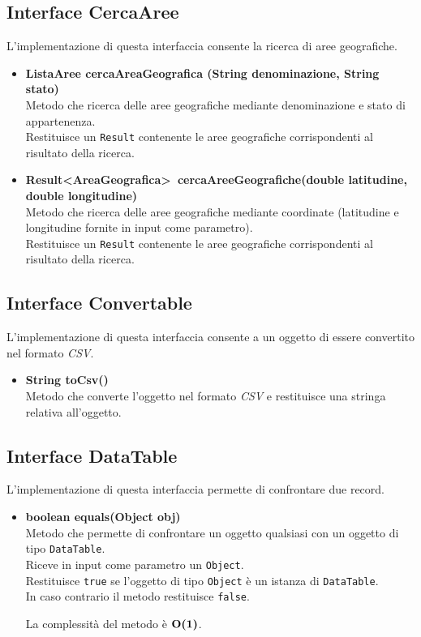\documentclass[a4paper, 12pt]{scrreprt}
\begin{document}
			\subsection{Interface CercaAree}
			L'implementazione di questa interfaccia consente la ricerca di aree geografiche.
			\begin{itemize}
				\item \textbf{ListaAree cercaAreaGeografica (String denominazione, String stato)}
				\\Metodo che ricerca delle aree geografiche mediante denominazione e stato di appartenenza.
				\\Restituisce un \verb!Result! contenente le aree geografiche corrispondenti al risultato della ricerca.
				
				\item\textbf{Result\textless AreaGeografica\textgreater~cercaAreeGeografiche(double latitudine, double longitudine)}
				\\Metodo che ricerca delle aree geografiche mediante coordinate (latitudine e longitudine fornite in input come parametro).
				\\Restituisce un \verb!Result! contenente le aree geografiche corrispondenti al risultato della ricerca.
				
			\end{itemize}

			\subsection{Interface Convertable}
			L'implementazione di questa interfaccia consente a un oggetto di essere convertito nel formato \textsl{CSV}.
			\begin{itemize}
				\item \textbf{String toCsv()}
				\\Metodo che converte l'oggetto nel formato \textsl{CSV} e restituisce una stringa relativa all'oggetto.
				
			\end{itemize}
			\subsection{Interface DataTable}
			L'implementazione di questa interfaccia permette di confrontare due record.
			\begin{itemize}
				\item\textbf{boolean equals(Object obj)}
				\\Metodo che permette di confrontare un oggetto qualsiasi con un oggetto di tipo \verb!DataTable!.
				\\Riceve in input come parametro un \verb!Object!.
				\\Restituisce \verb!true! se l'oggetto di tipo \verb!Object! \`e un istanza di \verb!DataTable!.
				\\In caso contrario il metodo restituisce \verb!false!.
				
				La complessit\`a del metodo \`e $\mathbf{O}\textbf{(1)}$.
				
			\end{itemize}
\end{document}
